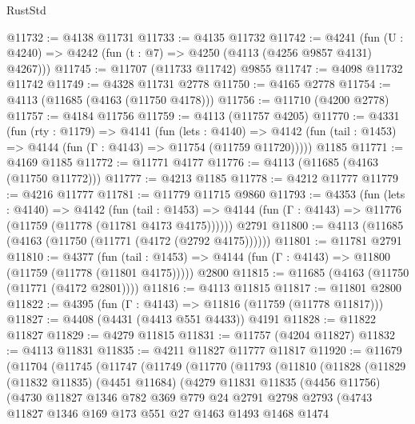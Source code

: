 \begin{lexlean}{RustStd}
\begin{coremodule}
@11732 := @4138 @11731
@11733 := @4135 @11732
@11742 := @4241 (fun (U : @4240) => @4242 (fun (t : @7) => @4250 (@4113 (@4256 @9857 @4131) @4267)))
@11745 := @11707 (@11733 @11742) @9855
@11747 := @4098 @11732 @11742
@11749 := @4328 @11731 @2778
@11750 := @4165 @2778
@11754 := @4113 (@11685 (@4163 (@11750 @4178)))
@11756 := @11710 (@4200 @2778)
@11757 := @4184 @11756
@11759 := @4113 (@11757 @4205)
@11770 := @4331
    (fun (rty : @1179) =>
    @4141
      (fun (lets : @4140) =>
      @4142 (fun (tail : @1453) => @4144 (fun (Γ : @4143) => @11754 (@11759 @11720)))))
    @1185
@11771 := @4169 @1185
@11772 := @11771 @4177
@11776 := @4113 (@11685 (@4163 (@11750 @11772)))
@11777 := @4213 @1185
@11778 := @4212 @11777
@11779 := @4216 @11777
@11781 := @11779 @11715 @9860
@11793 := @4353
    (fun (lets : @4140) =>
    @4142
      (fun (tail : @1453) =>
      @4144 (fun (Γ : @4143) => @11776 (@11759 (@11778 (@11781 @4173 @4175))))))
    @2791
@11800 := @4113 (@11685 (@4163 (@11750 (@11771 (@4172 (@2792 @4175))))))
@11801 := @11781 @2791
@11810 := @4377
    (fun (tail : @1453) => @4144 (fun (Γ : @4143) => @11800 (@11759 (@11778 (@11801 @4175)))))
    @2800
@11815 := @11685 (@4163 (@11750 (@11771 (@4172 @2801))))
@11816 := @4113 @11815
@11817 := @11801 @2800
@11822 := @4395 (fun (Γ : @4143) => @11816 (@11759 (@11778 @11817)))
@11827 := @4408 (@4431 (@4413 @551 @4433)) @4191
@11828 := @11822 @11827
@11829 := @4279 @11815
@11831 := @11757 (@4204 @11827)
@11832 := @4113 @11831
@11835 := @4211 @11827 @11777 @11817
@11920 := @11679
    (@11704
      (@11745
        (@11747
          (@11749
            (@11770
              (@11793
                (@11810
                  (@11828
                    (@11829
                      (@11832 @11835)
                      (@4451 @11684)
                      (@4279
                        @11831
                        @11835
                        (@4456 @11756)
                        (@4730
                          @11827
                          @1346
                          @782
                          @369
                          @779
                          @24
                          @2791
                          @2798
                          @2793
                          (@4743
                            @11827
                            @1346
                            @169
                            @173
                            @551
                            @27
                            @1463
                            @1493
                            @1468
                            @1474

\end{coremodule}
\end{lexlean}
